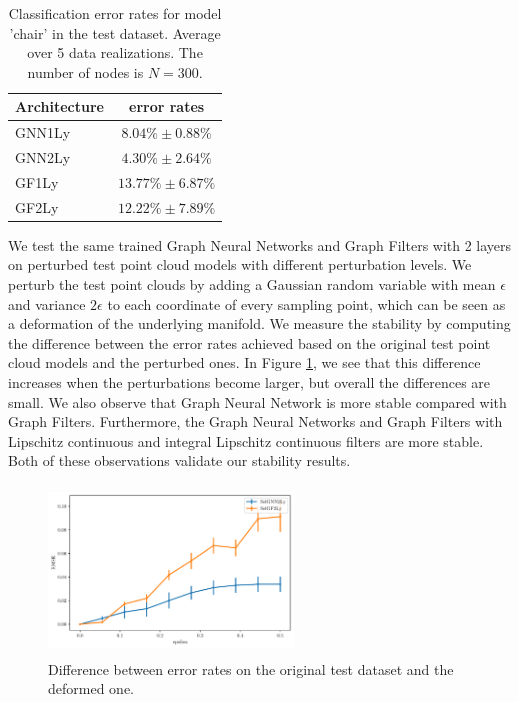 \begin{table}[h]
\centering
\begin{tabular}{l|c} \hline
Architecture    & error rates   \\ \hline
GNN1Ly	& $8.04 \% \pm 0.88\% $   \\ \hline
GNN2Ly		& $4.30\% \pm 2.64\%$   \\ \hline
GF1Ly		& $13.77\% \pm 6.87\%$   \\ \hline
GF2Ly	& $12.22\% \pm 7.89\%$   \\ \hline
\end{tabular}
\caption{Classification error rates for model 'chair' in the test dataset. Average over 5 data realizations. The number of nodes is $N=300$.}
\label{tb:results}
\vspace{-3mm}
\end{table} 

 We test the same trained Graph Neural Networks and Graph Filters with 2 layers on perturbed test point cloud models with different perturbation levels. We perturb the test point clouds by adding a Gaussian random variable with mean $\epsilon$ and variance $2\epsilon$ to each coordinate of every sampling point, which can be seen as a deformation of the underlying manifold. We measure the stability by computing the difference between the error rates achieved based on the original test point cloud models and the perturbed ones. In Figure \ref{fig:sim}, we see that this difference increases when the perturbations become larger, but overall the differences are small. We also observe that Graph Neural Network is more stable compared with Graph Filters. Furthermore, the Graph Neural Networks and Graph Filters with Lipschitz continuous and integral Lipschitz continuous filters are more stable. Both of these observations validate our stability results. 

\begin{figure}[h]
  \centering
  \includegraphics[height=4.5cm,width=6.5cm]{allCostTest.pdf}
\caption{Difference between error rates on the original test dataset and the deformed one. }
\label{fig:sim}
\end{figure}

